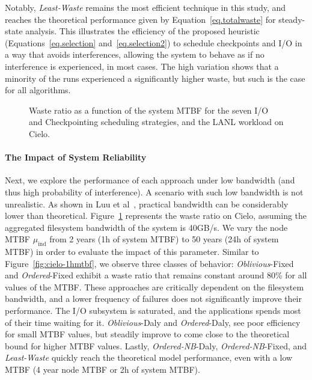 \documentclass[two]{article}
\newcommand{\muind}{\mu_{\text{ind}}}
\newcommand{\nocoop}{\emph{Oblivious}\xspace}
\newcommand{\fifoblock}{\emph{Ordered}\xspace}
\newcommand{\fifononblock}{\emph{Ordered-NB}\xspace}
\newcommand{\leastwaste}{\emph{Least-Waste}\xspace}
\def\propfixed{\nocoop-Fixed\xspace}
\def\propdaly{\nocoop-Daly\xspace}
\def\bfifofixed{\fifoblock-Fixed\xspace}
\def\bfifodaly{\fifoblock-Daly\xspace}
\def\fifofixed{\fifononblock-Fixed\xspace}
\def\fifodaly{\fifononblock-Daly\xspace}
\def\cooperative{\leastwaste}
\begin{document}
Notably, \cooperative remains the most efficient technique in this study, and
reaches the theoretical performance given by Equation~\eqref{eq.totalwaste} for
steady-state analysis. This illustrates the efficiency of the proposed
heuristic (Equations~\eqref{eq.selection} and~\eqref{eq.selection2}) to
schedule checkpoints and I/O in a way that avoids interferences, allowing the
system to behave as if no interference is experienced, in most cases. The high
variation shows that a minority of the runs experienced a significantly higher
waste, but such is the case for all algorithms.

\begin{figure}
  \begin{center}
    \resizebox{1.05\linewidth}{!}{}
  \end{center}
  \caption{Waste ratio as a function of the system MTBF for the
    seven I/O and Checkpointing scheduling strategies, and the LANL workload on
    Cielo. \label{fig:cielo-40gbs}}
\end{figure}

\paragraph{The Impact of System Reliability}
Next, we explore the performance of each approach under low bandwidth (and
thus high probability of interference). A scenario with such low bandwidth is not
unrealistic.  As shown in Luu et al~\cite{Luu:2015:Multiplatform}, practical
bandwidth can be considerably lower than theoretical.
Figure~\ref{fig:cielo-40gbs} represents the waste ratio on Cielo, assuming the
aggregated filesystem bandwidth of the system is 40GB/s. We vary the node MTBF
$\muind$ from 2 years (1h of system MTBF) to 50 years (24h of system MTBF) in
order to evaluate the impact of this parameter. Similar to
Figure~\ref{fig:cielo-1hmtbf}, we observe three classes of behavior: \propfixed
and \bfifofixed exhibit a waste ratio that remains constant around 80\% for all
values of the MTBF. These approaches are critically dependent on the filesystem
bandwidth, and a lower frequency of failures does not significantly improve
their performance. The I/O subsystem is saturated, and the applications spends
most of their time waiting for it.
%
\propdaly and \bfifodaly, see poor efficiency for small MTBF values, but
steadily improve to come close to the theoretical bound for higher MTBF values.
Lastly, \fifodaly, \fifofixed, and \cooperative quickly reach the theoretical
model performance, even with a low  MTBF (4 year node MTBF or 2h of
system MTBF).
\end{document}
